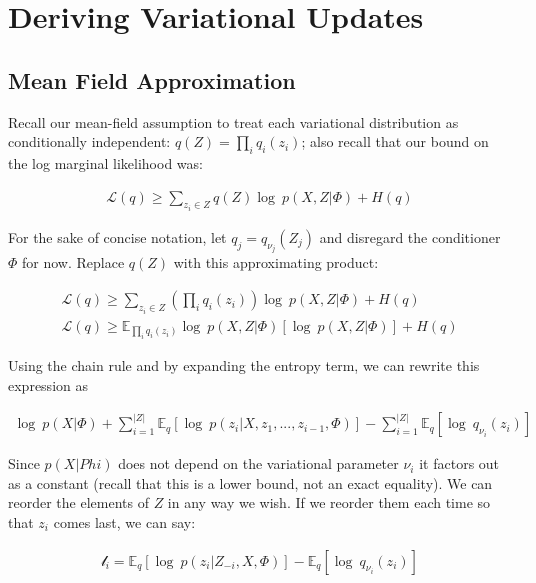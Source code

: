 

\section{Deriving Variational Updates}
\label{append_b}

\subsection{Mean Field Approximation }

Recall our mean-field assumption to treat each variational distribution as conditionally independent: $q(Z) = \prod\limits_{i} q_i(z_i)$; also recall that our bound on the log marginal likelihood was:


\begin{align} 
\nonumber \mathcal{L}(q) \geq \sum\limits_{z_i \in Z} q(Z) \log\ p(X,Z|\Phi) + H(q) \end{align}


For the sake of concise notation, let $q_j = q_{\nu_j}(Z_j)$ and disregard the conditioner $\Phi$ for now. Replace $q(Z)$ with this approximating product:

\begin{align} 
\nonumber \mathcal{L}(q) \geq \sum\limits_{z_i \in Z} \left( \prod\limits_{i} q_i(z_i) \right) \log\ p(X,Z|\Phi) + H(q) \\
\mathcal{L}(q) \geq \mathbb{E}_{ \prod\limits_{i} q_i(z_i) } \log\ p(X,Z|\Phi) [\log\ p(X,Z|\Phi)] + H(q)
\end{align}

Using the chain rule and by expanding the entropy term, we can rewrite this expression as

\begin{align} \log\ p(X|\Phi) + \sum\limits_{i=1}^{| Z|} \mathbb{E}_q [\log\ p(z_i | X, z_1,..., z_{i-1}, \Phi)] - \sum\limits_{i=1}^{| Z|} \mathbb{E}_q[\log\ q_{\nu_i}(z_i)] \end{align}

Since $p(X \vert Phi)$ does not depend on the variational parameter $\nu_i$ it factors out as a constant (recall that this is a lower bound, not an exact equality). We can reorder the elements of $Z$ in any way we wish. If we reorder them each time so that $z_i$ comes last, we can say:

\begin{align} \mathcal{l}_i = \mathbb{E}_q[\log\ p(z_i| Z_{-i}, X, \Phi)] - \mathbb{E}_q[\log\ q_{\nu_i}(z_i)]
\end{align} \citep{blei:2006}

